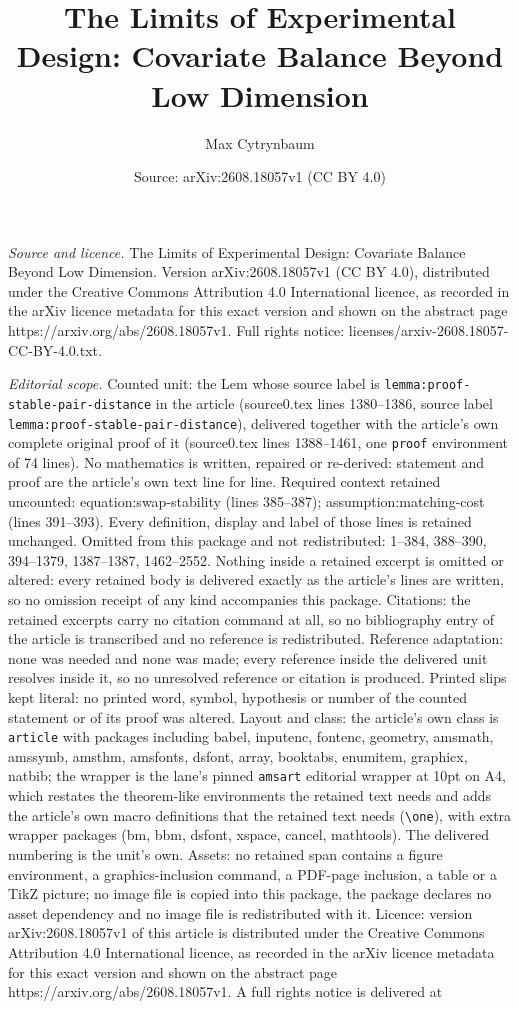 \documentclass[10pt,a4paper]{amsart}
\title[The Limits of Experimental Design: Covariate Balance Beyond ]{The Limits of Experimental Design: Covariate Balance Beyond Low Dimension}
\author{Max Cytrynbaum}
\date{Source: arXiv:2608.18057v1 (CC BY 4.0)}
\begin{document}
\maketitle

\noindent\emph{Source and licence.} The Limits of Experimental Design: Covariate Balance Beyond Low Dimension. Version arXiv:2608.18057v1 (CC BY 4.0), distributed under the Creative Commons Attribution 4.0 International licence, as recorded in the arXiv licence metadata for this exact version and shown on the abstract page https://arxiv.org/abs/2608.18057v1. Full rights notice: licenses/arxiv-2608.18057-CC-BY-4.0.txt.\par\smallskip

\noindent\textit{Editorial scope.} Counted unit: the Lem whose source label is \texttt{lemma:proof-stable-pair-distance} in the article (source0.tex lines 1380--1386, source label \texttt{lemma:proof-stable-pair-distance}), delivered together with the article's own complete original proof of it (source0.tex lines 1388--1461, one \texttt{proof} environment of 74 lines). No mathematics is written, repaired or re-derived: statement and proof are the article's own text line for line. Required context retained uncounted: equation:swap-stability (lines 385--387); assumption:matching-cost (lines 391--393). Every definition, display and label of those lines is retained unchanged. Omitted from this package and not redistributed: 1--384, 388--390, 394--1379, 1387--1387, 1462--2552. Nothing inside a retained excerpt is omitted or altered: every retained body is delivered exactly as the article's lines are written, so no omission receipt of any kind accompanies this package. Citations: the retained excerpts carry no citation command at all, so no bibliography entry of the article is transcribed and no reference is redistributed. Reference adaptation: none was needed and none was made; every reference inside the delivered unit resolves inside it, so no unresolved reference or citation is produced. Printed slips kept literal: no printed word, symbol, hypothesis or number of the counted statement or of its proof was altered. Layout and class: the article's own class is \texttt{article} with packages including babel, inputenc, fontenc, geometry, amsmath, amssymb, amsthm, amsfonts, dsfont, array, booktabs, enumitem, graphicx, natbib; the wrapper is the lane's pinned \texttt{amsart} editorial wrapper at 10pt on A4, which restates the theorem-like environments the retained text needs and adds the article's own macro definitions that the retained text needs (\texttt{\textbackslash one}), with extra wrapper packages (bm, bbm, dsfont, xspace, cancel, mathtools). The delivered numbering is the unit's own. Assets: no retained span contains a figure environment, a graphics-inclusion command, a PDF-page inclusion, a table or a TikZ picture; no image file is copied into this package, the package declares no asset dependency and no image file is redistributed with it. Licence: version arXiv:2608.18057v1 of this article is distributed under the Creative Commons Attribution 4.0 International licence, as recorded in the arXiv licence metadata for this exact version and shown on the abstract page https://arxiv.org/abs/2608.18057v1. A full rights notice is delivered at 
\end{document}

